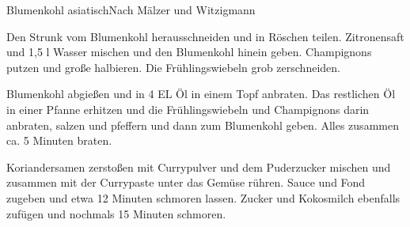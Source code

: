 \begin{recipe}{Blumenkohl asiatisch}{Nach Mälzer und Witzigmann}
  \label{Blumekohl}
  \inglist

  \steps

  Den Strunk vom Blumenkohl herausschneiden und in Röschen teilen. Zitronensaft
  und 1,5 l Wasser mischen und den Blumenkohl hinein geben. Champignons putzen
  und große halbieren. Die Frühlingswiebeln grob zerschneiden.

  Blumenkohl abgießen und in 4 EL Öl in einem Topf anbraten. Das restlichen Öl
  in einer Pfanne erhitzen und die Frühlingswiebeln und Champignons darin
  anbraten, salzen und pfeffern und dann zum Blumenkohl geben. Alles zusammen
  ca. 5 Minuten braten.

  Koriandersamen zerstoßen mit Currypulver und dem Puderzucker mischen und
  zusammen mit der Currypaste unter das Gemüse rühren. Sauce und Fond zugeben
  und etwa 12 Minuten schmoren lassen. Zucker und Kokosmilch ebenfalls zufügen
  und nochmals 15 Minuten schmoren.
\end{recipe}